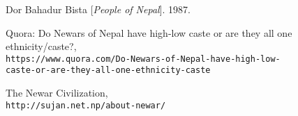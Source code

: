 \newpage
	\begin{thebibliography}{9}

		Dor Bahadur Bista
			[\textit{People of Nepal}].
		1987.

		Quora: Do Newars of Nepal have high-low caste or are they all one ethnicity/caste?,
		\\\texttt{https://www.quora.com/Do-Newars-of-Nepal-have-high-low- \\ caste-or-are-they-all-one-ethnicity-caste}

		The Newar Civilization,
		\\\texttt{http://sujan.net.np/about-newar/}

	\end{thebibliography}
